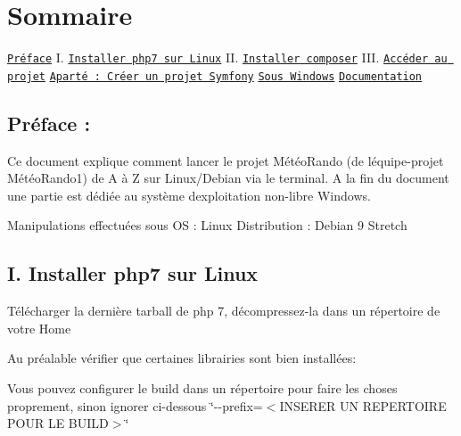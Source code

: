 \section*{Sommaire}

\href{#preface}{\tt Préface} I. \href{#install_php7_linux}{\tt Installer php7 sur Linux} II. \href{#install_composer}{\tt Installer composer} I\+II. \href{#acces_projet}{\tt Accéder au projet} \href{#aparte}{\tt Aparté \+: Créer un projet Symfony} \href{#msdos}{\tt Sous Windows} \href{#doc}{\tt Documentation}

\subsection*{Préface \+: \label{_preface}%
}

Ce document explique comment lancer le projet Météo\+Rando (de l\textquotesingle{}équipe-\/projet Météo\+Rando1) de A à Z sur Linux/\+Debian via le terminal. A la fin du document une partie est dédiée au système d\textquotesingle{}exploitation non-\/libre Windows.

Manipulations effectuées sous OS \+: Linux Distribution \+: Debian 9 Stretch

\subsection*{I. Installer php7 sur Linux \label{_install_php7_linux}%
}


\begin{DoxyItemize}
\item Télécharger la dernière tarball de php 7, décompressez-\/la dans un répertoire de votre Home
\item Au préalable vérifier que certaines librairies sont bien installées\+:
\end{DoxyItemize}





\begin{DoxyItemize}
\item Vous pouvez configurer le build dans un répertoire pour faire les choses proprement, sinon ignorer ci-\/dessous \char`\"{}-\/-\/prefix=$<$\+I\+N\+S\+E\+R\+E\+R U\+N R\+E\+P\+E\+R\+T\+O\+I\+R\+E P\+O\+U\+R L\+E B\+U\+I\+L\+D$>$\char`\"{}
\end{DoxyItemize}


